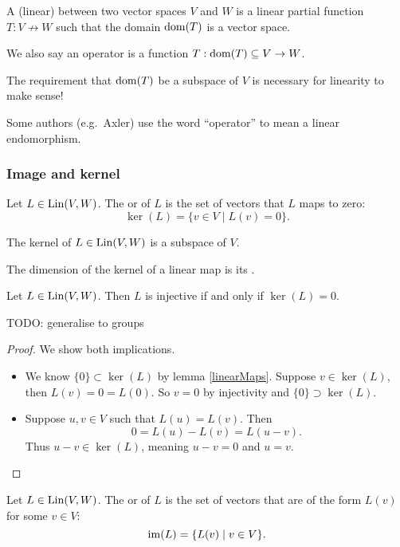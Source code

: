 \begin{definition}
A (linear)  between two vector spaces $V$ and $W$ is a linear partial function $T: V \not\to W$ such that the domain $\operatorname{dom}(T)$ is a vector space.

We also say an operator is a function $T: \operatorname{dom}(T)\subseteq V\to W$.
\end{definition}
The requirement that $\operatorname{dom}(T)$ be a subspace of $V$ is necessary for linearity to make sense!

Some authors (e.g.\ Axler) use the word ``operator'' to mean a linear endomorphism.

\subsubsection{Image and kernel}
\begin{definition}
Let $L \in \operatorname{Lin}(V,W)$. The  or  of $L$ is the set of vectors that $L$ maps to zero:
\[ \ker(L) = \{ v\in V \;|\; L(v) = 0 \}. \]
\end{definition}
\begin{proposition} \label{kernelSubspace}
The kernel of $L\in \operatorname{Lin}(V,W)$ is a subspace of $V$.
\end{proposition}
\begin{definition}
The dimension of the kernel of a linear map is its .
\end{definition}
\begin{proposition} \label{injectivityKernelTriviality}
Let $L\in\operatorname{Lin}(V,W)$. Then $L$ is injective if and only if $\ker(L) = 0$.
\end{proposition}
TODO: generalise to groups
\begin{proof}
We show both implications.
\begin{itemize}
\item[\boxed{\Rightarrow}] We know $\{0\}\subset \ker(L)$ by lemma \ref{linearMaps}. Suppose $v\in \ker(L)$, then $L(v) = 0 = L(0)$. So $v=0$ by injectivity and $\{0\}\supset \ker(L)$.
\item[\boxed{\Leftarrow}] Suppose $u,v \in V$ such that $L(u)=L(v)$. Then
\[ 0 = L(u) - L(v) = L(u-v). \]
Thus $u-v\in \ker(L)$, meaning $u-v = 0$ and $u=v$.
\end{itemize}
\end{proof}

\begin{definition}
Let $L \in \operatorname{Lin}(V,W)$. The  or  of $L$ is the set of vectors that are of the form $L(v)$ for some $v\in V$:
\[ \im(L) = \setbuilder{L(v)}{v\in V}. \]
\end{definition}

